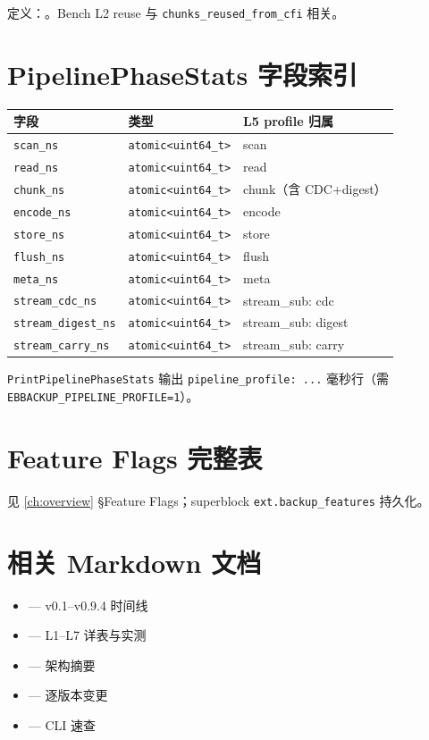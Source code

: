 定义：。Bench L2 reuse 与 \texttt{chunks\_reused\_from\_cfi} 相关。

\section{PipelinePhaseStats 字段索引}

\begin{longtable}{@{}llp{8cm}@{}}
\toprule
字段 & 类型 & L5 profile 归属 \\
\midrule
\texttt{scan\_ns} & \texttt{atomic<uint64\_t>} & scan \\
\texttt{read\_ns} & \texttt{atomic<uint64\_t>} & read \\
\texttt{chunk\_ns} & \texttt{atomic<uint64\_t>} & chunk（含 CDC+digest） \\
\texttt{encode\_ns} & \texttt{atomic<uint64\_t>} & encode \\
\texttt{store\_ns} & \texttt{atomic<uint64\_t>} & store \\
\texttt{flush\_ns} & \texttt{atomic<uint64\_t>} & flush \\
\texttt{meta\_ns} & \texttt{atomic<uint64\_t>} & meta \\
\texttt{stream\_cdc\_ns} & \texttt{atomic<uint64\_t>} & stream\_sub: cdc \\
\texttt{stream\_digest\_ns} & \texttt{atomic<uint64\_t>} & stream\_sub: digest \\
\texttt{stream\_carry\_ns} & \texttt{atomic<uint64\_t>} & stream\_sub: carry \\
\bottomrule
\end{longtable}

\texttt{PrintPipelinePhaseStats} 输出 \texttt{pipeline\_profile: ...} 毫秒行（需 \texttt{EBBACKUP\_PIPELINE\_PROFILE=1}）。

\section{Feature Flags 完整表}

见 \cref{ch:overview} §Feature Flags；superblock \texttt{ext.backup\_features} 持久化。

\section{相关 Markdown 文档}

\begin{itemize}
  \item {} — v0.1--v0.9.4 时间线
  \item {} — L1--L7 详表与实测
  \item {} — 架构摘要
  \item {} — 逐版本变更
  \item {} — CLI 速查
\end{itemize}
